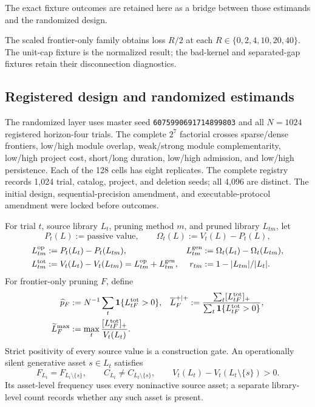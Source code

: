 The exact fixture outcomes are retained here as a bridge between those
estimands and the randomized design.
\begin{table}[htbp]
  \centering
  \small
  
  \caption{Selected-instance outcomes from the exact mechanism fixtures.}
  \label{tab:supp-numerical-mechanisms}
\end{table}

The scaled frontier-only family obtains loss \(R/2\) at each
\(R\in\{0,2,4,10,20,40\}\).  The unit-cap fixture is the normalized result;
the bad-kernel and separated-gap fixtures retain their disconnection
diagnostics.

\subsection{Registered design and randomized estimands}
\label{sec:supp-randomized-estimands}

The randomized layer uses master seed
\texttt{6075990691714899803} and all \(N=1024\) registered horizon-four
trials.  The complete \(2^7\) factorial crosses sparse/dense frontiers,
low/high module overlap, weak/strong module complementarity, low/high project
cost, short/long duration, low/high admission, and low/high persistence.  Each
of the 128 cells has eight replicates.  The complete registry records 1,024
trial, catalog, project, and deletion seeds; all 4,096 are distinct.  The
initial design, sequential-precision amendment, and executable-protocol
amendment were locked before outcomes.

For trial \(t\), source library \(L_t\), pruning method \(m\), and pruned
library \(L_{tm}\), let
\[
 P_t(L):=\text{passive value},\qquad
 \Omega_t(L):=V_t(L)-P_t(L),
\]
\[
\begin{aligned}
 L^{\rm op}_{tm}&:=P_t(L_t)-P_t(L_{tm}),&
 L^{\rm gen}_{tm}&:=\Omega_t(L_t)-\Omega_t(L_{tm}),\\
 L^{\rm tot}_{tm}&:=V_t(L_t)-V_t(L_{tm})
                  =L^{\rm op}_{tm}+L^{\rm gen}_{tm},&
 r_{tm}&:=1-|L_{tm}|/|L_t|.
\end{aligned}
\]
For frontier-only pruning \(F\), define
\[
\begin{aligned}
 \widehat p_F&:=N^{-1}\sum_t\mathbf 1\{L^{\rm tot}_{tF}>0\},&
 \overline L_F^{+\mid+}
   &:=\frac{\sum_t[L^{\rm tot}_{tF}]_+}
            {\sum_t\mathbf 1\{L^{\rm tot}_{tF}>0\}},\\
 \widetilde L_F^{\max}
   &:=\max_t\frac{[L^{\rm tot}_{tF}]_+}{V_t(L_t)} .
\end{aligned}
\]
Strict positivity of every source value is a construction gate.  An
operationally silent generative asset \(s\in L_t\) satisfies
\[
 F_{L_t}=F_{L_t\setminus\{s\}},\qquad
 C_{L_t}\ne C_{L_t\setminus\{s\}},\qquad
 V_t(L_t)-V_t(L_t\setminus\{s\})>0 .
\]
Its asset-level frequency uses every noninactive source asset; a separate
library-level count records whether any such asset is present.

